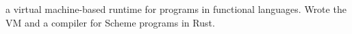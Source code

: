 \documentclass[a4paper]{tufte-handout}
\begin{document}
 a virtual machine-based runtime for programs in functional languages. Wrote the VM and a compiler for Scheme programs in Rust.
%
%
%
%
\end{document}
